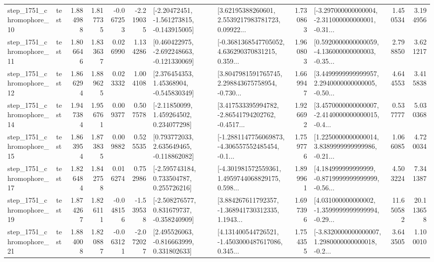 \begin{tabular}{llrrrrllrlrr}
 step\_1751\_chromophore\_10 &      test &      1.884988 &    1.817735 &     -0.067253 & -2.219035 &   [-2.20472451, -1.561273815, -0.143915005] &  [3.62195388260601, 2.5539217983781723, 0.09922... &       1.730863 &  [-3.297000000000004, -2.311000000000001, -0.31... &            1.450534 &          3.194956 \\
 step\_1751\_chromophore\_11 &      test &      1.806646 &    1.833637 &      0.026990 &  1.134286 &   [0.460422975, -2.692248663, -0.121330069] &  [-0.3681368547705052, 4.636290370831215, 0.359... &       1.960803 &  [0.5920000000000059, -4.136000000000003, -0.35... &            2.798850 &          3.621217 \\
 step\_1751\_chromophore\_12 &      test &      1.866294 &    1.889625 &      0.023332 &  1.004108 &     [2.376454353, 1.45368904, -0.545830349] &  [3.8047981591765745, 2.298843675758954, -0.730... &       1.669947 &  [3.4499999999999957, 2.2940000000000005, -0.50... &            4.644553 &          3.415838 \\
 step\_1751\_chromophore\_14 &      test &      1.947384 &    1.956761 &      0.009377 &  0.507578 &     [-2.11850099, 1.459264502, 0.234077298] &  [3.417533395994782, -2.86541794202762, -0.4517... &       1.926692 &  [3.4570000000000007, -2.4140000000000015, -0.4... &            0.537777 &          5.030368 \\
 step\_1751\_chromophore\_15 &      test &      1.863954 &    1.873835 &      0.009882 &  0.525535 &    [0.793772033, 2.635649465, -0.118862082] &  [-1.2881147756069873, -4.306557552485454, -0.1... &       1.759776 &  [1.2250000000000014, 3.8389999999999986, -0.21... &            1.066085 &          4.720034 \\
 step\_1751\_chromophore\_17 &      test &      1.826484 &    1.842758 &      0.016274 &  0.752986 &    [-2.595743184, 0.733504787, 0.255726216] &  [-4.301981572559361, 1.4959744068829175, 0.598... &       1.899961 &  [4.184999999999999, -0.8719999999999999, -0.56... &            4.503224 &          7.341387 \\
 step\_1751\_chromophore\_19 &      test &      1.874267 &    1.826111 &     -0.048156 & -1.539538 &   [-2.508276577, 0.831679737, -0.358240909] &  [3.884267611792357, -1.368941730312335, 1.1943... &       1.697396 &  [4.031000000000002, -1.3599999999999994, -0.29... &           11.650582 &         20.113658 \\
 step\_1751\_chromophore\_21 &      test &      1.884008 &    1.820887 &     -0.063121 & -2.072027 &    [2.495526063, -0.816663999, 0.331802633] &  [4.131400544726521, -1.4503000487617086, 0.345... &       1.754355 &  [-3.8320000000000007, 1.2980000000000018, -0.2... &            3.643505 &          1.100010 \\

\end{tabular}
